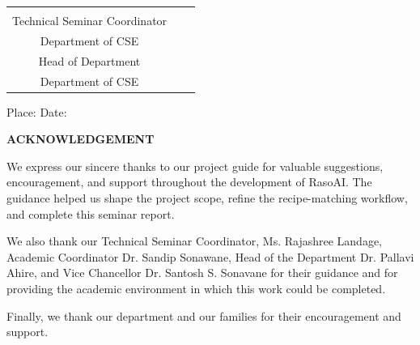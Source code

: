 \documentclass[12pt,a4paper]{report}
\begin{document}
\begin{center}
\begin{tabular}{ccc}
\begin{minipage}[t]{0.29\textwidth}
\centering
{\fontsize{12}{14}\selectfont Ms. Rajashree Landage}\\
{\fontsize{12}{14}\selectfont Technical Seminar Coordinator}\\
{\fontsize{12}{14}\selectfont Department of CSE}
\end{minipage}

&

\begin{minipage}[t]{0.29\textwidth}
\centering
{\fontsize{12}{14}\selectfont Dr. Pallavi Ahire}\\
{\fontsize{12}{14}\selectfont Head of Department}\\
{\fontsize{12}{14}\selectfont Department of CSE}
\end{minipage}

\end{tabular}

\end{center}

\vspace{1\baselineskip}

\noindent
{\fontsize{12}{14}\selectfont
Place: \underline{\hspace{2in}} \hfill Date: \underline{\hspace{1.5in}}
}

\clearpage
\begin{center}
{\fontsize{14}{16}\bfseries ACKNOWLEDGEMENT}
\end{center}

\vspace{1\baselineskip}

{\fontsize{12}{14}\selectfont 

\indent We express our sincere thanks to our project guide for valuable suggestions, encouragement, and support throughout the development of RasoAI. The guidance helped us shape the project scope, refine the recipe-matching workflow, and complete this seminar report.

\indent We also thank our Technical Seminar Coordinator, Ms. Rajashree Landage, Academic Coordinator Dr. Sandip Sonawane, Head of the Department Dr. Pallavi Ahire, and Vice Chancellor Dr. Santosh S. Sonavane for their guidance and for providing the academic environment in which this work could be completed.

\indent Finally, we thank our department and our families for their encouragement and support.

}
\end{document}
